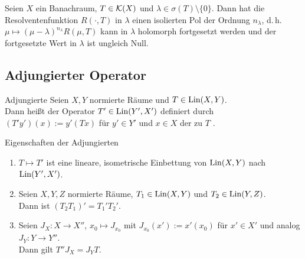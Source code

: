 \linie

\begin{Kor}
    Seien $X$ ein Banachraum, $T \in \mathcal{K}(X)$ und $\lambda \in \sigma(T) \setminus \{0\}$.
    Dann hat die Resolventenfunktion $R(\cdot, T)$ in $\lambda$ einen isolierten Pol
    der Ordnung $n_\lambda$, d.\,h.
    $\mu \mapsto (\mu - \lambda)^{n_\lambda} R(\mu, T)$ kann in $\lambda$ holomorph fortgesetzt
    werden und der fortgesetzte Wert in $\lambda$ ist ungleich Null.
\end{Kor}

\pagebreak

\subsection{%
    Adjungierter Operator%
}

\begin{Def}{Adjungierte}
    Seien $X, Y$ normierte Räume und $T \in \operatorname{Lin}(X, Y)$.\\
    Dann heißt der Operator $T' \in \operatorname{Lin}(Y', X')$ definiert durch
    $(T'y')(x) := y'(Tx)$ für $y' \in Y'$ und $x \in X$ der zu $T$ .
\end{Def}

\begin{Satz}{Eigenschaften der Adjungierten}
    \begin{enumerate}
        \item
        $T \mapsto T'$ ist eine lineare, isometrische Einbettung
        von $\operatorname{Lin}(X, Y)$ nach $\operatorname{Lin}(Y', X')$.

        \item
        Seien $X, Y, Z$ normierte Räume, $T_1 \in \operatorname{Lin}(X, Y)$ und $T_2 \in \operatorname{Lin}(Y, Z)$.\\
        Dann ist $(T_2 T_1)' = T_1' T_2'$.

        \item
        Seien $J_X\colon X \rightarrow X''$, $x_0 \mapsto J_{x_0}$ mit
        $J_{x_0}(x') := x'(x_0)$ für $x' \in X'$ und analog $J_Y\colon Y \rightarrow Y''$.\\
        Dann gilt $T'' J_X = J_Y T$.
    \end{enumerate}
\end{Satz}

